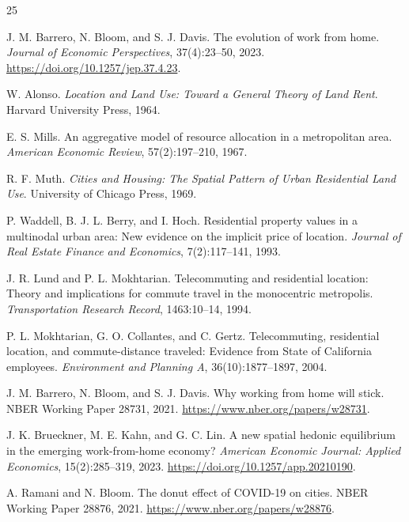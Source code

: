 \documentclass[11pt]{article}
\begin{document}
\begin{thebibliography}{25}

J. M. Barrero, N. Bloom, and S. J. Davis.
\newblock The evolution of work from home.
\newblock \emph{Journal of Economic Perspectives}, 37(4):23--50, 2023.
\newblock \url{https://doi.org/10.1257/jep.37.4.23}.

W. Alonso.
\newblock \emph{Location and Land Use: Toward a General Theory of Land Rent}.
\newblock Harvard University Press, 1964.

E. S. Mills.
\newblock An aggregative model of resource allocation in a metropolitan area.
\newblock \emph{American Economic Review}, 57(2):197--210, 1967.

R. F. Muth.
\newblock \emph{Cities and Housing: The Spatial Pattern of Urban Residential Land Use}.
\newblock University of Chicago Press, 1969.

P. Waddell, B. J. L. Berry, and I. Hoch.
\newblock Residential property values in a multinodal urban area: New evidence on the implicit price of location.
\newblock \emph{Journal of Real Estate Finance and Economics}, 7(2):117--141, 1993.

J. R. Lund and P. L. Mokhtarian.
\newblock Telecommuting and residential location: Theory and implications for commute travel in the monocentric metropolis.
\newblock \emph{Transportation Research Record}, 1463:10--14, 1994.

P. L. Mokhtarian, G. O. Collantes, and C. Gertz.
\newblock Telecommuting, residential location, and commute-distance traveled: Evidence from State of California employees.
\newblock \emph{Environment and Planning A}, 36(10):1877--1897, 2004.

J. M. Barrero, N. Bloom, and S. J. Davis.
\newblock Why working from home will stick.
\newblock NBER Working Paper 28731, 2021.
\newblock \url{https://www.nber.org/papers/w28731}.

J. K. Brueckner, M. E. Kahn, and G. C. Lin.
\newblock A new spatial hedonic equilibrium in the emerging work-from-home economy?
\newblock \emph{American Economic Journal: Applied Economics}, 15(2):285--319, 2023.
\newblock \url{https://doi.org/10.1257/app.20210190}.

A. Ramani and N. Bloom.
\newblock The donut effect of COVID-19 on cities.
\newblock NBER Working Paper 28876, 2021.
\newblock \url{https://www.nber.org/papers/w28876}.


\end{thebibliography}
\end{document}
